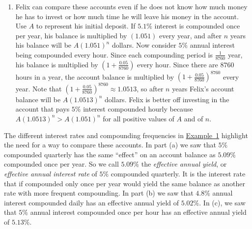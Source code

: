 \documentclass[10pt,]{book}
\theoremstyle{ptxdefinitionnotitle}
\theoremstyle{ptxdefinitiontitle}
\theoremstyle{ptxdefinitionnotitle}
\theoremstyle{ptxdefinitiontitle}
\theoremstyle{ptxdefinitionnotitle}
\theoremstyle{ptxdefinitiontitle}
\numberwithin{equation}{section}
\begin{document}
\begin{example}
\begin{enumerate}
\item\hypertarget{li-104}{}Felix can compare these accounts even if he does not know how much money he has to invest or how much time he will leave his money in the account.  Use \(A\) to represent his initial deposit.  If \(5.1\%\) interest is compounded once per year, his balance is multiplied by \((1.051)\) every year, and after \(n\) years his balance will be \(A(1.051)^n\) dollars. Now consider \(5\%\) annual interest being compounded every hour.  Since each compounding period is \(\frac{1}{8760}\) year, his balance is multiplied by \((1+\frac{0.05}{8760})\) every hour. Since there are \(8760\) hours in a year, the account balance is multiplied by \((1+\frac{0.05}{8760})^{8760}\) every year. Note that \((1 + \frac{0.05}{8760} )^{8760} \approx 1.0513\), so after \(n\) years Felix’s account balance will be \(A(1.0513)^n\) dollars. Felix is better off investing in the account that pays \(5\%\) interest compounded hourly because \(A(1.0513)^n > A(1.051)^n\) for all positive values of \(A\) and of \(n\).%
\end{enumerate}
\end{example}
\hypertarget{p-205}{}%
The different interest rates and compounding frequencies in \hyperref[chapter04-section05-investment-accounts]{Example~1} highlight the need for a way to compare these accounts. In part (a) we saw that \(5\%\) compounded quarterly has the same “effect” on an account balance as \(5.09\%\) compounded once per year. So we call \(5.09\%\) the \emph{effective annual yield}, or \emph{effective annual interest rate} of \(5\%\) compounded quarterly.  It is the interest rate that if compounded only once per year would yield the same balance as another rate with more frequent compounding. In part (b) we saw that \(4.8\%\) annual interest compounded daily has an effective annual yield of \(5.02\%\). In (c), we saw that \(5\%\) annual interest compounded once per hour has an effective annual yield of \(5.13\%\).%
\typeout{************************************************}
\typeout{************************************************}
\end{document}
